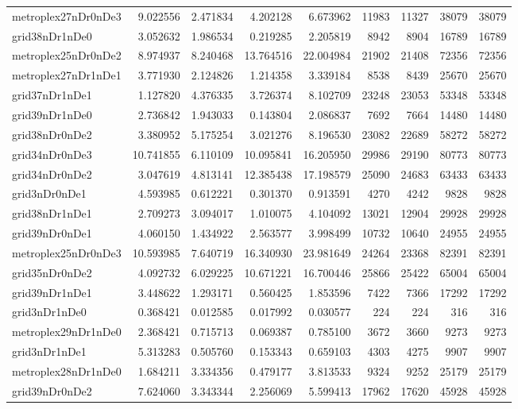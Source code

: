 \begin{longtable}{|l|r|r|r|r|r|r|r|r|}
metroplex27nDr0nDe3 & 9.022556 & 2.471834 & 4.202128 & 6.673962 & 11983 & 11327 & 38079 & 38079 \\
grid38nDr1nDe0 & 3.052632 & 1.986534 & 0.219285 & 2.205819 & 8942 & 8904 & 16789 & 16789 \\
metroplex25nDr0nDe2 & 8.974937 & 8.240468 & 13.764516 & 22.004984 & 21902 & 21408 & 72356 & 72356 \\
metroplex27nDr1nDe1 & 3.771930 & 2.124826 & 1.214358 & 3.339184 & 8538 & 8439 & 25670 & 25670 \\
grid37nDr1nDe1 & 1.127820 & 4.376335 & 3.726374 & 8.102709 & 23248 & 23053 & 53348 & 53348 \\
grid39nDr1nDe0 & 2.736842 & 1.943033 & 0.143804 & 2.086837 & 7692 & 7664 & 14480 & 14480 \\
grid38nDr0nDe2 & 3.380952 & 5.175254 & 3.021276 & 8.196530 & 23082 & 22689 & 58272 & 58272 \\
grid34nDr0nDe3 & 10.741855 & 6.110109 & 10.095841 & 16.205950 & 29986 & 29190 & 80773 & 80773 \\
grid34nDr0nDe2 & 3.047619 & 4.813141 & 12.385438 & 17.198579 & 25090 & 24683 & 63433 & 63433 \\
grid3nDr0nDe1 & 4.593985 & 0.612221 & 0.301370 & 0.913591 & 4270 & 4242 & 9828 & 9828 \\
grid38nDr1nDe1 & 2.709273 & 3.094017 & 1.010075 & 4.104092 & 13021 & 12904 & 29928 & 29928 \\
grid39nDr0nDe1 & 4.060150 & 1.434922 & 2.563577 & 3.998499 & 10732 & 10640 & 24955 & 24955 \\
metroplex25nDr0nDe3 & 10.593985 & 7.640719 & 16.340930 & 23.981649 & 24264 & 23368 & 82391 & 82391 \\
grid35nDr0nDe2 & 4.092732 & 6.029225 & 10.671221 & 16.700446 & 25866 & 25422 & 65004 & 65004 \\
grid39nDr1nDe1 & 3.448622 & 1.293171 & 0.560425 & 1.853596 & 7422 & 7366 & 17292 & 17292 \\
grid3nDr1nDe0 & 0.368421 & 0.012585 & 0.017992 & 0.030577 & 224 & 224 & 316 & 316 \\
metroplex29nDr1nDe0 & 2.368421 & 0.715713 & 0.069387 & 0.785100 & 3672 & 3660 & 9273 & 9273 \\
grid3nDr1nDe1 & 5.313283 & 0.505760 & 0.153343 & 0.659103 & 4303 & 4275 & 9907 & 9907 \\
metroplex28nDr1nDe0 & 1.684211 & 3.334356 & 0.479177 & 3.813533 & 9324 & 9252 & 25179 & 25179 \\
grid39nDr0nDe2 & 7.624060 & 3.343344 & 2.256069 & 5.599413 & 17962 & 17620 & 45928 & 45928 \\

\end{longtable}
